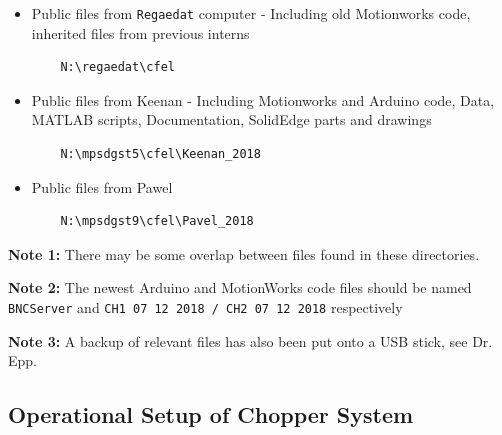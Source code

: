 \documentclass{article}
\begin{document}
    \begin{itemize}
        \item Public files from \texttt{Regaedat} computer - Including old Motionworks code, inherited files from previous interns
            \begin{verbatim}
    N:\regaedat\cfel
            \end{verbatim}
        \item Public files from Keenan - Including Motionworks and Arduino code, Data, MATLAB scripts, Documentation, SolidEdge parts and drawings
            \begin{verbatim}
    N:\mpsdgst5\cfel\Keenan_2018
            \end{verbatim}
        \item Public files from Pawel 
            \begin{verbatim}
    N:\mpsdgst9\cfel\Pavel_2018
            \end{verbatim}
    \end{itemize}
    
    \noindent\textbf{Note 1:} There may be some overlap between files found in these directories. 
    
    \noindent \textbf{Note 2:} The newest Arduino and MotionWorks code files should be named \texttt{BNCServer} and \texttt{CH1 07 12 2018 / CH2 07 12 2018} respectively
     
    \noindent \textbf{Note 3:} A backup of relevant files has also been put onto a USB stick, see Dr. Epp.
    
    \subsection{Operational Setup of Chopper System} \label{appendix_setup}
    
\end{document}
